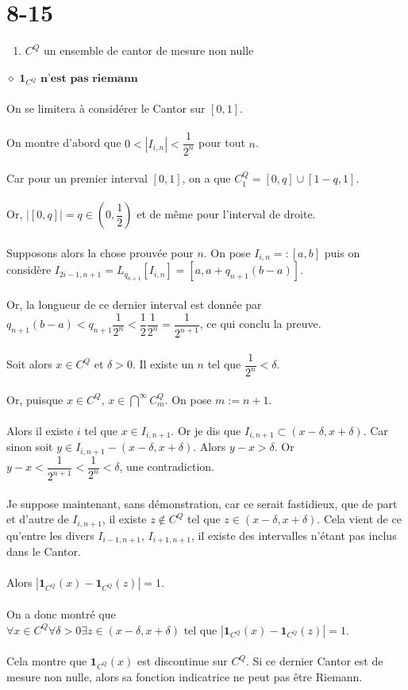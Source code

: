 \documentclass[a4paper,10pt]{article}
\begin{document}
\section*{8-15}
\begin{enumerate}
 \item $C^Q$ un ensemble de cantor de mesure non nulle
\end{enumerate}
$\diamond$ $\textbf{1}_{C^Q} \textbf{ n'est pas riemann}$
\\
\\
On se limitera à considérer le Cantor sur $[0,1]$.
\\
\\
On montre d'abord que $0 < |I_{i,n}| < \dfrac{1}{2^n}$ pour tout $n$.
\\
\\
Car pour un premier interval $[0,1]$, on a que $C^Q_1 = [0, q] \cup [1 - q, 1]$.
\\
\\
Or, $|[0, q]| = q \in (0, \dfrac{1}{2})$ et de même pour l'interval de droite.
\\
\\
Supposons alors la chose prouvée pour $n$. On pose $I_{i,n} =: [a,b]$ puis on
considère $I_{2i-1, n+1} = L_{q_{n+1}} \left[ I_{i,n}\right] = [a, a + q_{n+1}(b-a)]$.
\\
\\
Or, la longueur de ce dernier interval est donnée par $q_{n+1}(b-a) < q_{n+1}\dfrac{1}{2^n} < \dfrac{1}{2}\dfrac{1}{2^n} = \dfrac{1}{2^{n+1}}$,
ce qui conclu la preuve.
\\
\\
Soit alors $x \in C^Q$ et $\delta > 0$. Il existe un $n$ tel que $\dfrac{1}{2^n} < \delta$. 
\\
\\
Or, puisque $x \in C^Q$, $x \in \bigcap\limits^\infty C^Q_m$. On pose $m := n+1$.
\\
\\
Alors il existe $i$ tel que $x \in I_{i,n+1}$. Or je dis que $I_{i,n+1} \subset (x - \delta, x + \delta)$. 
Car sinon soit $y \in I_{i,n+1} - (x - \delta, x + \delta)$. Alors $y - x > \delta$. 
Or $y - x < \dfrac{1}{2^{n+1}} < \dfrac{1}{2^n} < \delta$, une contradiction.
\\
\\
Je suppose maintenant, sans démonstration, car ce serait fastidieux, que de part et d'autre de $I_{i, n+1}$, il existe
$z \not\in C^Q$ tel que $z \in (x - \delta, x + \delta)$. Cela vient de ce qu'entre les divers $I_{i-1, n+1}$, $I_{i+1, n+1}$,
il existe des intervalles n'étant pas inclus dans le Cantor. 
\\
\\
Alors $|\textbf{1}_{C^Q}(x) - \textbf{1}_{C^Q}(z)| = 1$.
\\
\\
On a donc montré que $\forall x \in C^Q \forall \delta > 0 \exists z \in (x - \delta, x + \delta) 
\text{ tel que } |\textbf{1}_{C^Q}(x) - \textbf{1}_{C^Q}(z)| = 1$.
\\
\\
Cela montre que $\textbf{1}_{C^Q}(x)$ est discontinue sur $C^Q$. Si ce dernier Cantor est de mesure non nulle,
alors sa fonction indicatrice ne peut pas être Riemann.
\end{document}
